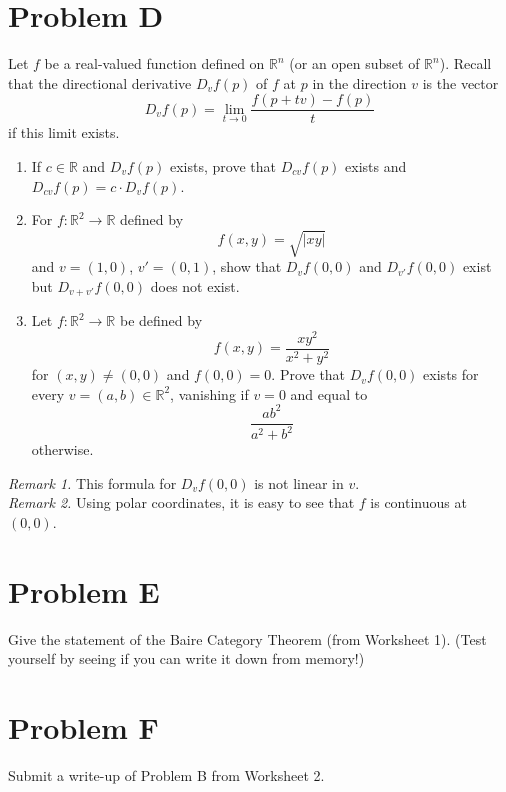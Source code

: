 \documentclass[lang=en,11pt]{template}
\begin{document}
\section*{Problem D}
Let \( f \) be a real-valued function defined on \( \mathbb{R}^n \) (or an open subset of \( \mathbb{R}^n \)). Recall that the directional derivative \( D_v f(p) \) of \( f \) at \( p \) in the direction \( v \) is the vector
\[
D_v f(p) = \lim_{t \to 0} \frac{f(p + tv) - f(p)}{t}
\]
if this limit exists.
\begin{enumerate}
    \item If \( c \in \mathbb{R} \) and \( D_v f(p) \) exists, prove that \( D_{cv} f(p) \) exists and \( D_{cv} f(p) = c \cdot D_v f(p) \).
    \item For \( f : \mathbb{R}^2 \to \mathbb{R} \) defined by
    \[
    f(x, y) = \sqrt{|xy|}
    \]
    and \( v = (1, 0) \), \( v' = (0, 1) \), show that \( D_v f(0, 0) \) and \( D_{v'} f(0, 0) \) exist but \( D_{v+v'} f(0, 0) \) does not exist.
    \item Let \( f : \mathbb{R}^2 \to \mathbb{R} \) be defined by
    \[
    f(x, y) = \frac{xy^2}{x^2 + y^2}
    \]
    for \( (x, y) \neq (0, 0) \) and \( f(0, 0) = 0 \). Prove that \( D_v f(0, 0) \) exists for every \( v = (a, b) \in \mathbb{R}^2 \), vanishing if \( v = 0 \) and equal to
    \[
    \frac{ab^2}{a^2 + b^2}
    \]
    otherwise.
\end{enumerate}
\textit{Remark 1.} This formula for \( D_v f(0, 0) \) is not linear in \( v \).\\
\textit{Remark 2.} Using polar coordinates, it is easy to see that \( f \) is continuous at \( (0, 0) \).

\section*{Problem E}
Give the statement of the Baire Category Theorem (from Worksheet 1). (Test yourself by seeing if you can write it down from memory!)

\section*{Problem F}
Submit a write-up of Problem B from Worksheet 2.
\end{document}

